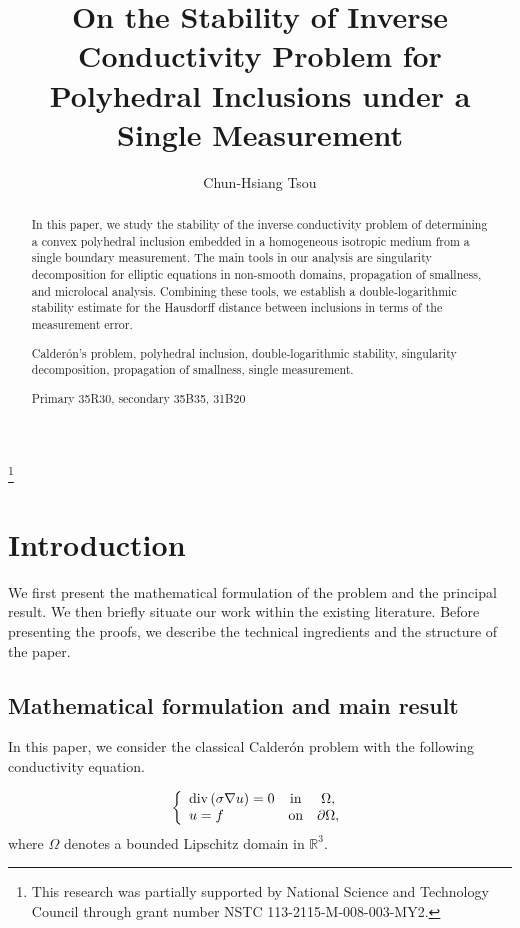 ﻿\documentclass[11pt,reqno,oneside]{amsart}
\title[stability for polyhedral inclusions]{On the Stability of Inverse Conductivity Problem for Polyhedral Inclusions under a Single Measurement}
\author{Chun-Hsiang Tsou}
\date{} %
\theoremstyle{definition}
\theoremstyle{remark}
\newcommand{\ba}{\begin{array}}
\newcommand{\ea}{\end{array}}
\newcommand{\dvg}{{\rm div}\,}
\newcommand{\R}{\mathbb{R}}
\newcommand{\n}{\nabla}
\newcommand{\p}{\partial}
\renewcommand{\O}{\Omega}
\begin{document}
\begin{abstract}

In this paper, we study the stability of the inverse conductivity problem of determining a convex polyhedral inclusion embedded in a homogeneous isotropic medium from a single boundary measurement. The main tools in our analysis are singularity decomposition for elliptic equations in non-smooth domains, propagation of smallness, and microlocal analysis. Combining these tools, we establish a double-logarithmic stability estimate for the Hausdorff distance between inclusions in terms of the measurement error.

 Calder\'on's problem, polyhedral inclusion, double-logarithmic stability, singularity decomposition, propagation of smallness, single measurement.

 Primary 35R30, secondary 35B35, 31B20

\end{abstract}

\thanks{This research was partially supported by National Science and Technology Council through grant number NSTC 113-2115-M-008-003-MY2.}

\maketitle

\section{Introduction}

We first present the mathematical formulation of the problem and the principal result. We then briefly situate our work within the existing literature. Before presenting the proofs, we describe the technical ingredients and the structure of the paper.

\subsection{Mathematical formulation and main result}

In this paper, we consider the classical Calder\'on problem with the following conductivity equation.

\begin{align}\label{eq:calderon}
    \left\lbrace  \ba{lcc} \dvg(\sigma \n u)=0 & {\rm in}& \O, \\ u=f & {\rm on} & \p\O, \ea \right.
\end{align}
 where $\O$ denotes a bounded Lipschitz domain in $\R^3$.
\end{document}
